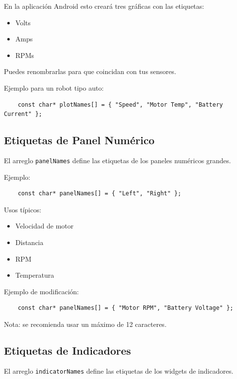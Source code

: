 En la aplicación Android esto creará tres gráficas con las etiquetas:

\begin{itemize}
    \item Volts
    \item Amps
    \item RPMs
\end{itemize}

Puedes renombrarlas para que coincidan con tus sensores.

Ejemplo para un robot tipo auto:

\begin{verbatim}
    const char* plotNames[] = { "Speed", "Motor Temp", "Battery Current" };
\end{verbatim}

\subsection{Etiquetas de Panel Numérico}

El arreglo \texttt{panelNames} define las etiquetas de los paneles numéricos grandes.

Ejemplo:

\begin{verbatim}
    const char* panelNames[] = { "Left", "Right" };
\end{verbatim}

Usos típicos:

\begin{itemize}
    \item Velocidad de motor
    \item Distancia
    \item RPM
    \item Temperatura
\end{itemize}

Ejemplo de modificación:

\begin{verbatim}
    const char* panelNames[] = { "Motor RPM", "Battery Voltage" };
\end{verbatim}

Nota: se recomienda usar un máximo de 12 caracteres.

\subsection{Etiquetas de Indicadores}

El arreglo \texttt{indicatorNames} define las etiquetas de los widgets de indicadores.

